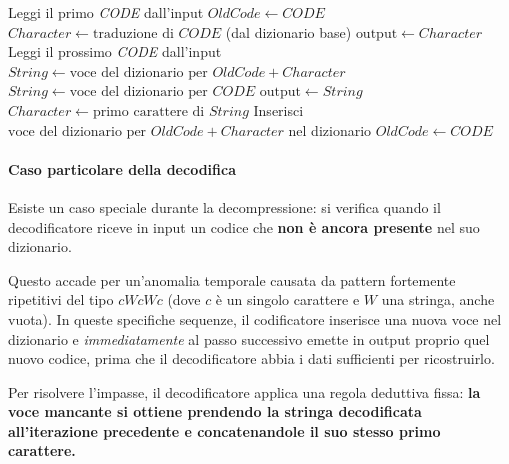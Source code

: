 \begin{algorithm}[htbp]
\caption{Algoritmo di decodifica LZW}
\begin{algorithmic}[1]
\State Leggi il primo \textit{CODE} dall'input
\State $\mathit{OldCode} \gets \mathit{CODE}$
\State $\mathit{Character} \gets \text{traduzione di } \mathit{CODE}$ (dal dizionario base)
\State $\text{output} \gets \mathit{Character}$
    \State Leggi il prossimo \textit{CODE} dall'input
        \State $\mathit{String} \gets \text{voce del dizionario per } \mathit{OldCode} + \mathit{Character}$
    \Else
        \State $\mathit{String} \gets \text{voce del dizionario per } \mathit{CODE}$
    \EndIf
    \State $\text{output} \gets \mathit{String}$
    \State $\mathit{Character} \gets \text{primo carattere di } \mathit{String}$
    \State Inserisci $\text{voce del dizionario per } \mathit{OldCode} + \mathit{Character}$ nel dizionario
    \State $\mathit{OldCode} \gets \mathit{CODE}$
\EndWhile
\end{algorithmic}
\end{algorithm}

\paragraph{Caso particolare della decodifica}
Esiste un caso speciale durante la decompressione: si verifica quando il decodificatore riceve in input un codice che \textbf{non è ancora presente} nel suo dizionario. 

Questo accade per un'anomalia temporale causata da pattern fortemente ripetitivi del tipo $cWcWc$ (dove $c$ è un singolo carattere e $W$ una stringa, anche vuota). In queste specifiche sequenze, il codificatore inserisce una nuova voce nel dizionario e \textit{immediatamente} al passo successivo emette in output proprio quel nuovo codice, prima che il decodificatore abbia i dati sufficienti per ricostruirlo.

Per risolvere l'impasse, il decodificatore applica una regola deduttiva fissa: \textbf{la voce mancante si ottiene prendendo la stringa decodificata all'iterazione precedente e concatenandole il suo stesso primo carattere.}

